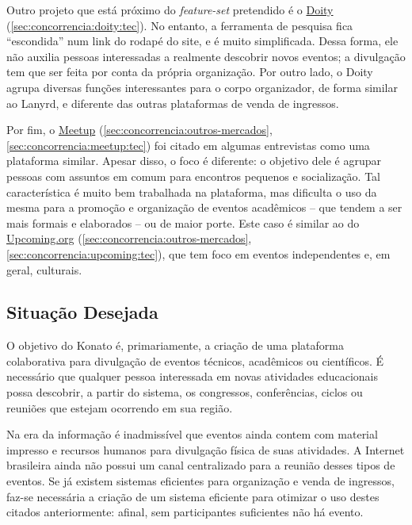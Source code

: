 \documentclass[12pt,a4paper,twoside,hyphens,english,brazil]{abntex2}
\begin{document}
Outro projeto que está próximo do \emph{feature-set} pretendido é o \underline{Doity} (\autoref{sec:concorrencia:doity:tec}). No entanto, a ferramenta de pesquisa fica ``escondida'' num link do rodapé do site, e é muito simplificada. Dessa forma, ele não auxilia pessoas interessadas a realmente descobrir novos eventos; a divulgação tem que ser feita por conta da própria organização. Por outro lado, o Doity agrupa diversas funções interessantes para o corpo organizador, de forma similar ao Lanyrd, e diferente das outras plataformas de venda de ingressos.

Por fim, o \underline{Meetup} (\autoref{sec:concorrencia:outros-mercados}, \autoref{sec:concorrencia:meetup:tec}) foi citado em algumas entrevistas como uma plataforma similar. Apesar disso, o foco é diferente: o objetivo dele é agrupar pessoas com assuntos em comum para encontros pequenos e socialização. Tal característica é muito bem trabalhada na plataforma, mas dificulta o uso da mesma para a promoção e organização de eventos acadêmicos -- que tendem a ser mais formais e elaborados -- ou de maior porte. Este caso é similar ao do \underline{Upcoming.org} (\autoref{sec:concorrencia:outros-mercados}, \autoref{sec:concorrencia:upcoming:tec}), que tem foco em eventos independentes e, em geral, culturais.

\subsection{Situação Desejada}
O objetivo do Konato é, primariamente, a criação de uma plataforma colaborativa para divulgação de eventos técnicos, acadêmicos ou científicos. É necessário que qualquer pessoa interessada em novas atividades educacionais possa descobrir, a partir do sistema, os congressos, conferências, ciclos ou reuniões que estejam ocorrendo em sua região.

Na era da informação é inadmissível que eventos ainda contem com material impresso e recursos humanos para divulgação física de suas atividades. A Internet brasileira ainda não possui um canal centralizado para a reunião desses tipos de eventos. Se já existem sistemas eficientes para organização e venda de ingressos, faz-se necessária a criação de um sistema eficiente para otimizar o uso destes citados anteriormente: afinal, sem participantes suficientes não há evento.

\end{document}
